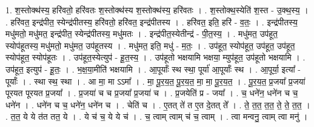 \documentclass[17pt]{extarticle}
\begin{document}
1. श॒स्तोक्थ॑स्य॒ हरि॑वतो॒ हरि॑वतः श॒स्तोक्थ॑स्य श॒स्तोक्थ॑स्य॒ हरि॑वतः । . श॒स्तोक्थ॒स्येति॑ श॒स्त - उ॒क्थ॒स्य॒ । . हरि॑वत॒ इन्द्र॑पीत॒ स्येन्द्र॑पीतस्य॒ हरि॑वतो॒ हरि॑वत॒ इन्द्र॑पीतस्य । . हरि॑वत॒ इति॒ हरि॑ - व॒तः॒ । . इन्द्र॑पीतस्य॒ मधु॑मतो॒ मधु॑मत॒ इन्द्र॑पीत॒ स्येन्द्र॑पीतस्य॒ मधु॑मतः । . इन्द्र॑पीत॒स्येतीन्द्र॑ - पी॒त॒स्य॒ । . मधु॑मत॒ उप॑हूत॒ स्योप॑हूतस्य॒ मधु॑मतो॒ मधु॑मत॒ उप॑हूतस्य । . मधु॑मत॒ इति॒ मधु॑ - म॒तः॒ । . उप॑हूत॒ स्योप॑हूत॒ उप॑हूत॒ उप॑हूत॒ स्योप॑हूत॒ स्योप॑हूतः । . उप॑हूत॒स्येत्युप॑ - हू॒त॒स्य॒ । . उप॑हूतो भक्षयामि भक्षया॒ म्युप॑हूत॒ उप॑हूतो भक्षयामि । . उप॑हूत॒ इत्युप॑ - हू॒तः॒ । . भ॒क्ष॒या॒मीति॑ भक्षयामि । . आ॒पूर्याः᳚ स्थ स्था॒ पूर्या॑ आ॒पूर्याः᳚ स्थ । . आ॒पूर्या॒ इत्या᳚ - पूर्याः᳚ । . स्था स्थ॒ स्था । . आ मा॒ मा ऽऽमा᳚ । . मा॒ पू॒र॒य॒त॒ पू॒र॒य॒त॒ मा॒ मा॒ पू॒र॒य॒त॒ । . पू॒र॒य॒त॒ प्र॒जया᳚ प्र॒जया॑ पूरयत पूरयत प्र॒जया᳚ । . प्र॒जया॑ च च प्र॒जया᳚ प्र॒जया॑ च । . प्र॒जयेति॑ प्र - जया᳚ । . च॒ धने॑न॒ धने॑न च च॒ धने॑न । . धने॑न च च॒ धने॑न॒ धने॑न च । . चेति॑ च । . ए॒तत् ते॑ त ए॒त दे॒तत् ते᳚ । . ते॒ त॒त॒ त॒त॒ ते॒ ते॒ त॒त॒ । . त॒त॒ ये ये त॑त तत॒ ये । . ये च॑ च॒ ये ये च॑ । . च॒ त्वाम् त्वाम् च॑ च॒ त्वाम् । . त्वा मन्वनु॒ त्वाम् त्वा मनु॑ । \newline
\end{document}
